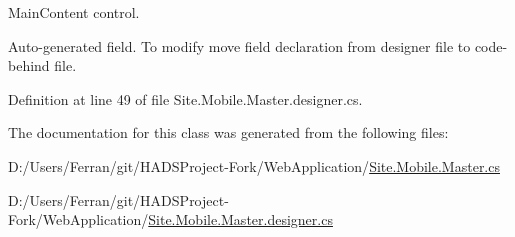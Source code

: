 Main\+Content control. 

Auto-\/generated field. To modify move field declaration from designer file to code-\/behind file. 

Definition at line 49 of file Site.\+Mobile.\+Master.\+designer.\+cs.



The documentation for this class was generated from the following files\+:\begin{DoxyCompactItemize}
\item 
D\+:/\+Users/\+Ferran/git/\+H\+A\+D\+S\+Project-\/\+Fork/\+Web\+Application/\mbox{\hyperlink{Site_8Mobile_8Master_8cs}{Site.\+Mobile.\+Master.\+cs}}\item 
D\+:/\+Users/\+Ferran/git/\+H\+A\+D\+S\+Project-\/\+Fork/\+Web\+Application/\mbox{\hyperlink{Site_8Mobile_8Master_8designer_8cs}{Site.\+Mobile.\+Master.\+designer.\+cs}}\end{DoxyCompactItemize}
